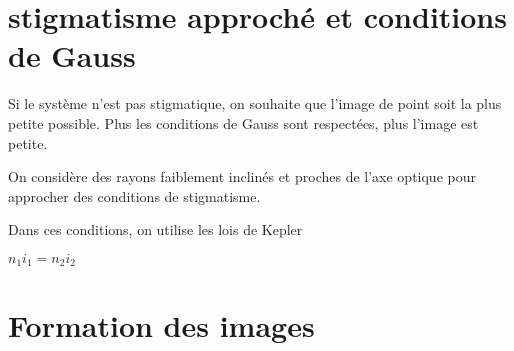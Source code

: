 \documentclass[french]{yLectureNote}
\begin{document}
%
\section{stigmatisme approché et conditions de Gauss}

Si le système n'est pas stigmatique, on souhaite que l'image de point soit la plus petite possible. Plus les conditions de Gauss sont respectées, plus l'image est petite.
\begin{definition}
On considère des rayons faiblement inclinés et proches de l'axe optique pour approcher des conditions de stigmatisme.
\end{definition}
Dans ces conditions, on utilise les lois de Kepler
\begin{theorem}
 \(n_1i_1 = n_2i_2\)
\end{theorem}
\section{Formation des images}
\end{document}
